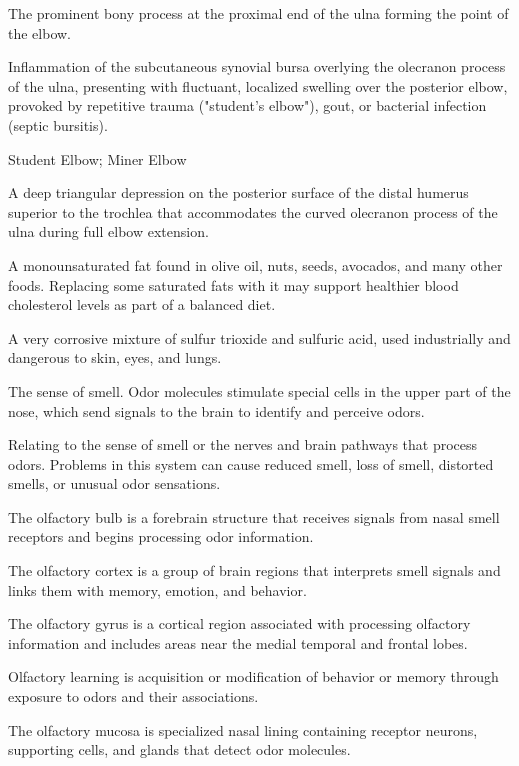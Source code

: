  The prominent bony process at the proximal end of the ulna forming the point of the elbow.

 Inflammation of the subcutaneous synovial bursa overlying the olecranon process of the ulna, presenting with fluctuant, localized swelling over the posterior elbow, provoked by repetitive trauma ("student's elbow"), gout, or bacterial infection (septic bursitis).

\synonyms
Student Elbow; Miner Elbow

 A deep triangular depression on the posterior surface of the distal humerus superior to the trochlea that accommodates the curved olecranon process of the ulna during full elbow extension.

 A monounsaturated fat found in olive oil, nuts, seeds, avocados, and many other foods. Replacing some saturated fats with it may support healthier blood cholesterol levels as part of a balanced diet.

 A very corrosive mixture of sulfur trioxide and sulfuric acid, used industrially and dangerous to skin, eyes, and lungs.

 The sense of smell. Odor molecules stimulate special cells in the upper part of the nose, which send signals to the brain to identify and perceive odors.

 Relating to the sense of smell or the nerves and brain pathways that process odors. Problems in this system can cause reduced smell, loss of smell, distorted smells, or unusual odor sensations.

 The olfactory bulb is a forebrain structure that receives signals from nasal smell receptors and begins processing odor information.

 The olfactory cortex is a group of brain regions that interprets smell signals and links them with memory, emotion, and behavior.

 The olfactory gyrus is a cortical region associated with processing olfactory information and includes areas near the medial temporal and frontal lobes.

 Olfactory learning is acquisition or modification of behavior or memory through exposure to odors and their associations.

 The olfactory mucosa is specialized nasal lining containing receptor neurons, supporting cells, and glands that detect odor molecules.

